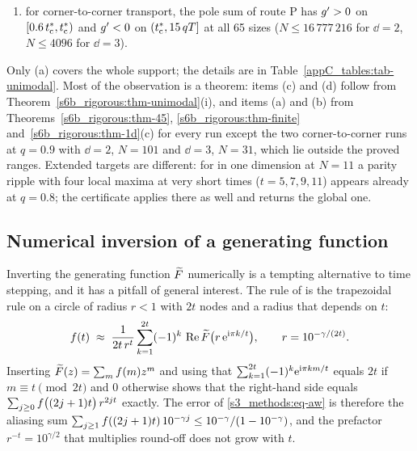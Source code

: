 \begin{observation}
\begin{enumerate}
$0.11\,q\MF$ (\CC, $N=4096$);
\item[(d)] for corner-to-corner transport, the pole sum of route P has $g'>0$ on $[0.6\,t^{*}_{\mathrm{c}},t^{*}_{\mathrm{c}})$ and
$g'<0$ on $(t^{*}_{\mathrm{c}},15\,qT]$ at all 65 sizes ($N\le16\,777\,216$ for $\dd=2$, $N\le4096$ for $\dd=3$).
\end{enumerate}
\end{observation}

Only (a) covers the whole support; the details are in Table~\ref{appC_tables:tab-unimodal}. Most of the observation is
a theorem: items (c) and (d) follow from Theorem~\ref{s6b_rigorous:thm-unimodal}(i), and items (a) and (b) from
Theorems~\ref{s6b_rigorous:thm-45}, \ref{s6b_rigorous:thm-finite} and~\ref{s6b_rigorous:thm-1d}(c) for every run except
the two corner-to-corner runs at $q=0.9$ with $\dd=2$, $N=101$ and $\dd=3$, $N=31$, which lie outside the proved
ranges. Extended targets are different: for \EXIT{} in one dimension at $N=11$ a parity ripple with four local maxima
at very short times ($t=5,7,9,11$) appears already at $q=0.8$; the certificate applies there as well and returns the
global one.

\subsection{Numerical inversion of a generating function}\label{s3_methods:ssec-aw}

Inverting the generating function $\widetilde{F}$ numerically is a tempting alternative to time stepping, and it has a
pitfall of general interest. The rule of \citet{AbateWhitt1992ORL,AbateWhitt1992QS} is the trapezoidal rule on a
circle of radius $r<1$ with $2t$ nodes and a radius that depends on $t$:
\begin{equation}\label{s3_methods:eq-aw}
  f(t)\;\approx\;\frac{1}{2t\,r^{t}}\sum_{k=1}^{2t}(-1)^{k}\,\operatorname{Re}\widetilde{F}\bigl(r\,\mathrm{e}^{\mathrm{i}\pi k/t}\bigr),
  \qquad r=10^{-\gamma/(2t)} .
\end{equation}
Inserting $\widetilde{F}(z)=\sum_{m}f(m)z^{m}$ and using that $\sum_{k=1}^{2t}(-1)^{k}\mathrm{e}^{\mathrm{i}\pi km/t}$ equals $2t$ if
$m\equiv t \pmod{2t}$ and $0$ otherwise shows that the right-hand side equals
$\sum_{j\ge0}f\bigl((2j+1)t\bigr)\,r^{2jt}$ exactly. The error of \eqref{s3_methods:eq-aw} is therefore the aliasing
sum $\sum_{j\ge1}f((2j+1)t)\,10^{-\gamma j}\le10^{-\gamma}/(1-10^{-\gamma})$, and the prefactor $r^{-t}=10^{\gamma/2}$ that
multiplies round-off does not grow with $t$.

